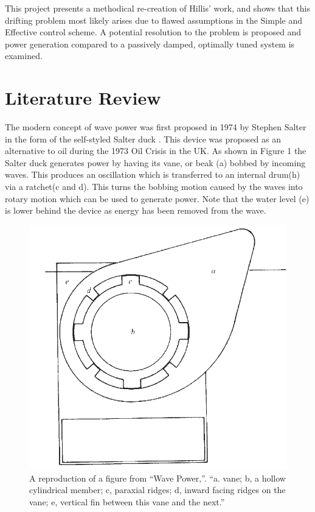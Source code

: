 \documentclass{report}
\begin{document}
This project presents a methodical re-creation of Hillis' work, and shows that this drifting problem most likely arises due to flawed assumptions in the Simple and Effective control scheme. A potential resolution to the problem is proposed and power generation compared to a passively damped, optimally tuned system is examined.

\chapter{Literature Review}
The modern concept of wave power was first proposed in 1974 by Stephen Salter in the form of the self-styled Salter duck \cite{salterDuck}. This device was proposed as an alternative to oil during the 1973 Oil Crisis in the UK. As shown in Figure 1 the Salter duck generates power by having its vane, or beak (a) bobbed by incoming waves. This produces an oscillation which is transferred to an internal drum(h) via a ratchet(c and d). This turns the bobbing motion caused by the waves into rotary motion which can be used to generate power. Note that the water level (e) is lower behind the device as energy has been removed from the wave.

\begin{figure}
\centering
\includegraphics[scale=0.25]{graphics/duck}
\caption{A reproduction of a figure from ``Wave Power,''\cite{salterDuck}. ``a. vane; b, a hollow cylindrical member; c, paraxial ridges; d, inward facing ridges on the vane; e, vertical fin between this vane and the next.''}
\label{fig:duck}
\end{figure}
\end{document}
